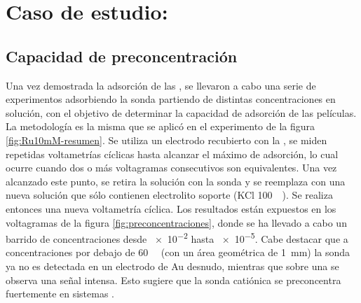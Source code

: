 \section{Caso de estudio: \texorpdfstring{\aminorutenioCompleto}{Ru(NH3)CL3}}
	
	\subsection{Capacidad de preconcentración}

		Una vez demostrada la adsorción \ru\space de las \pdm, se llevaron a cabo una serie de experimentos adsorbiendo la sonda partiendo de distintas concentraciones en solución, con el objetivo de determinar la capacidad de adsorción de las películas. La metodología es la misma que se aplicó en el experimento de la figura \ref{fig:Ru10mM-resumen}. Se utiliza un electrodo recubierto con la \pdmF, se miden repetidas voltametrías cíclicas hasta alcanzar el máximo de adsorción, lo cual ocurre cuando dos o más voltagramas consecutivos son equivalentes. Una vez alcanzado este punto, se retira la solución con la sonda y se reemplaza con una nueva solución que sólo contienen electrolito soporte (KCl \SI{100}{\milli\Molar}). Se realiza entonces una nueva voltametría cíclica. Los resultados están expuestos en los voltagramas de la figura \ref{fig:preconcentraciones}, donde se ha llevado a cabo un barrido de concentraciones desde \SI{e-2}{\Molar} hasta \SI{e-5}{\Molar}. Cabe destacar que a concentraciones por debajo de \SI{60}{\micro\Molar} (con un área geométrica de \SI{1}{mm}) la sonda ya no es detectada en un electrodo de Au desnudo, mientras que sobre una \pdm\space se observa una señal intensa. Esto sugiere que la sonda catiónica se preconcentra fuertemente en sistemas \pdmF.


